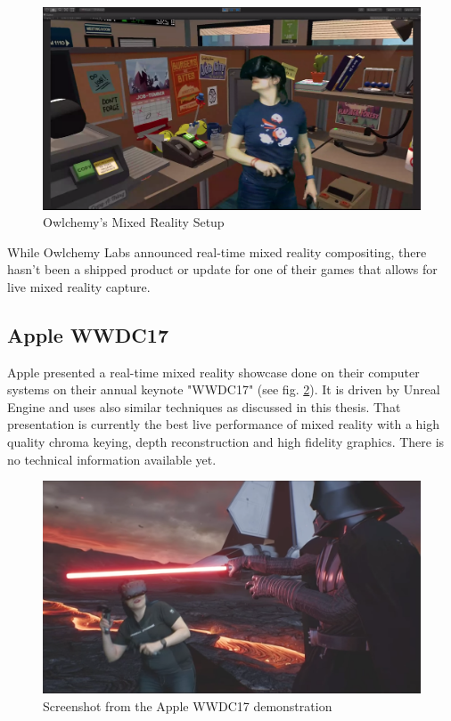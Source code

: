 \begin{figure}[htb]
	\centering
	\includegraphics[width=\textwidth]{_external/media/owlch-mr.png}
	\caption{Owlchemy's Mixed Reality Setup\cite{owlchemy:mr:3:2017}}
	\label{fig:mrproduction:owlchemy}
\end{figure}

While Owlchemy Labs announced real-time mixed reality compositing, there hasn't 
been a shipped product or update for one of their games that allows for live 
mixed reality capture\cite{owlchemy:mr:3:2017}.

\subsection{Apple WWDC17}

Apple presented a real-time mixed reality showcase done on their computer 
systems on their annual keynote "WWDC17" (see fig. 
\ref{fig:mrproduction:apple}). It is driven by Unreal Engine and 
uses also similar techniques as discussed in this thesis. That presentation is 
currently the best live performance of mixed reality with a high quality chroma 
keying, depth reconstruction and high fidelity graphics. There is no technical 
information available yet\cite{ilmxlab:mr-demo:2017}.

\begin{figure}[htb]
	\centering
	\includegraphics[width=\textwidth]{_external/media/apple-mr.png}
	\caption{Screenshot from the Apple WWDC17 
	demonstration\cite{ilmxlab:mr-demo:2017}}
	\label{fig:mrproduction:apple}
\end{figure}
